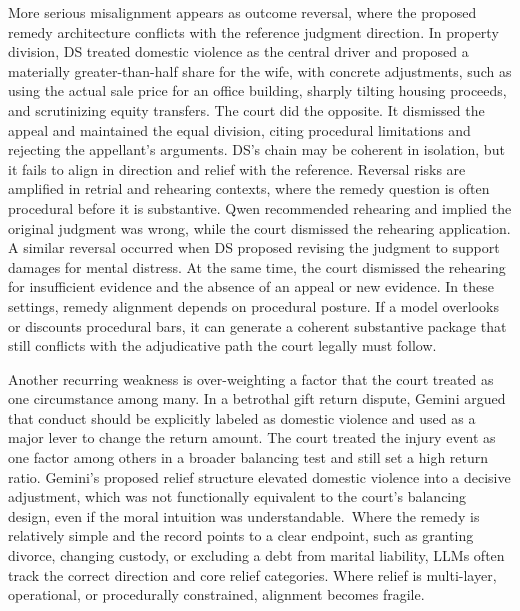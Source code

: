 \documentclass[pdflatex,sn-mathphys-ay]{sn-jnl}%
\theoremstyle{thmstyleone}%
\theoremstyle{thmstyletwo}%
\theoremstyle{thmstylethree}%
\begin{document}
More serious misalignment appears as outcome reversal, where the proposed remedy architecture conflicts with the reference judgment direction. In property division, DS treated domestic violence as the central driver and proposed a materially greater-than-half share for the wife, with concrete adjustments, such as using the actual sale price for an office building, sharply tilting housing proceeds, and scrutinizing equity transfers. The court did the opposite. It dismissed the appeal and maintained the equal division, citing procedural limitations and rejecting the appellant's arguments. DS's chain may be coherent in isolation, but it fails to align in direction and relief with the reference. Reversal risks are amplified in retrial and rehearing contexts, where the remedy question is often procedural before it is substantive. Qwen recommended rehearing and implied the original judgment was wrong, while the court dismissed the rehearing application. A similar reversal occurred when DS proposed revising the judgment to support damages for mental distress. At the same time, the court dismissed the rehearing for insufficient evidence and the absence of an appeal or new evidence. In these settings, remedy alignment depends on procedural posture. If a model overlooks or discounts procedural bars, it can generate a coherent substantive package that still conflicts with the adjudicative path the court legally must follow.

Another recurring weakness is over-weighting a factor that the court treated as one circumstance among many. In a betrothal gift return dispute, Gemini argued that conduct should be explicitly labeled as domestic violence and used as a major lever to change the return amount. The court treated the injury event as one factor among others in a broader balancing test and still set a high return ratio. Gemini's proposed relief structure elevated domestic violence into a decisive adjustment, which was not functionally equivalent to the court's balancing design, even if the moral intuition was understandable.~Where the remedy is relatively simple and the record points to a clear endpoint, such as granting divorce, changing custody, or excluding a debt from marital liability, LLMs often track the correct direction and core relief categories. Where relief is multi-layer, operational, or procedurally constrained, alignment becomes fragile.
\end{document}
